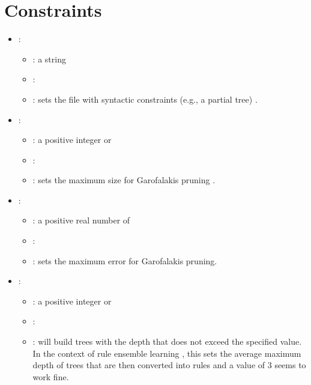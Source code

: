 \section{Constraints}


\begin{itemize}
    \item {}:
           \begin{itemize}
                \item \optionPossibleValues{}: a string
                \item \optionDefaultValue{}: 
                \item \optionDescrption{}: sets the file with syntactic constraints (e.g., a partial tree) \cite{Struyf06-KDID:proc}.
           \end{itemize}
    \item {}:
           \begin{itemize}
                \item \optionPossibleValues{}: a positive integer or 
                \item \optionDefaultValue{}: 
                \item \optionDescrption{}:  sets the maximum size for Garofalakis pruning \cite{Garofalakis03:jrnl, Struyf06-KDID:proc}.
           \end{itemize}
    \item {}:
           \begin{itemize}
                \item \optionPossibleValues{}: a positive real number of 
                \item \optionDefaultValue{}: 
                \item \optionDescrption{}: sets the maximum error for Garofalakis pruning.
           \end{itemize}
    \item {}:
           \begin{itemize}
                \item \optionPossibleValues{}: a positive integer or 
                \item \optionDefaultValue{}: 
                \item \optionDescrption{}: \clus{} will build trees with the depth that does not exceed the specified value. In the context of rule ensemble learning \cite{Aho2009},
                this sets the average maximum depth of trees that are then converted into rules and a value of 3 seems to work fine.
           \end{itemize}
\end{itemize}

